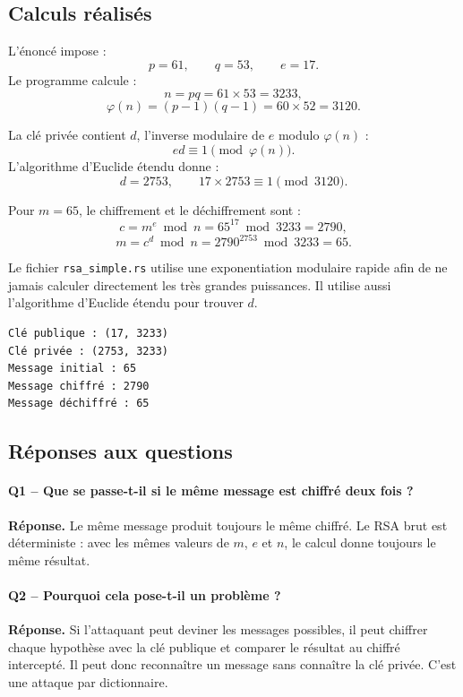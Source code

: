 \documentclass[11pt,a4paper]{article}
\newcommand{\fichier}[1]{\texttt{#1}}
\newcommand{\reponse}{\textbf{Réponse.} }
\begin{document}
\subsection{Calculs réalisés}

L'énoncé impose :
\[
    p=61, \qquad q=53, \qquad e=17.
\]
Le programme calcule :
\[
    n=pq=61\times 53=3233,
\]
\[
    \varphi(n)=(p-1)(q-1)=60\times 52=3120.
\]

La clé privée contient $d$, l'inverse modulaire de $e$ modulo $\varphi(n)$ :
\[
    ed\equiv 1\pmod{\varphi(n)}.
\]
L'algorithme d'Euclide étendu donne :
\[
    d=2753, \qquad 17\times 2753\equiv 1\pmod{3120}.
\]

Pour $m=65$, le chiffrement et le déchiffrement sont :
\[
    c=m^e\bmod n=65^{17}\bmod 3233=2790,
\]
\[
    m=c^d\bmod n=2790^{2753}\bmod 3233=65.
\]

Le fichier \fichier{rsa\_simple.rs} utilise une exponentiation modulaire rapide afin
de ne jamais calculer directement les très grandes puissances. Il utilise aussi
l'algorithme d'Euclide étendu pour trouver $d$.

\begin{verbatim}
Clé publique : (17, 3233)
Clé privée : (2753, 3233)
Message initial : 65
Message chiffré : 2790
Message déchiffré : 65
\end{verbatim}

\subsection{Réponses aux questions}

\paragraph{Q1 -- Que se passe-t-il si le même message est chiffré deux fois ?}
\reponse Le même message produit toujours le même chiffré. Le RSA brut est
déterministe : avec les mêmes valeurs de $m$, $e$ et $n$, le calcul donne toujours
le même résultat.

\paragraph{Q2 -- Pourquoi cela pose-t-il un problème ?}
\reponse Si l'attaquant peut deviner les messages possibles, il peut chiffrer chaque
hypothèse avec la clé publique et comparer le résultat au chiffré intercepté. Il peut
donc reconnaître un message sans connaître la clé privée. C'est une attaque par
dictionnaire.
\end{document}
